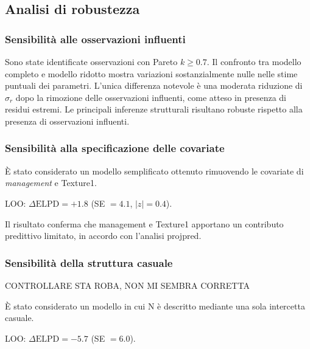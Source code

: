 \documentclass[11pt, a4paper]{article}
\begin{document}
%

\subsection{Analisi di robustezza}
\label{subsec:robustezza}

\subsubsection{Sensibilità alle osservazioni influenti}

Sono state identificate osservazioni con Pareto $k \geq 0.7$.
Il confronto tra modello completo e modello ridotto mostra variazioni sostanzialmente nulle nelle stime puntuali dei parametri. L'unica differenza notevole è una moderata riduzione di $\hat\sigma_r$ dopo la rimozione delle osservazioni influenti, come atteso in presenza di residui estremi. Le principali inferenze strutturali risultano robuste rispetto alla
presenza di osservazioni influenti.

\subsubsection{Sensibilità alla specificazione delle covariate}

È stato considerato un modello semplificato ottenuto rimuovendo le
covariate di \textit{management} e Texture1.

LOO:
$\Delta\text{ELPD}=+1.8$
(SE $=4.1$, $|z|=0.4$).

Il risultato conferma che management e Texture1 apportano un contributo
predittivo limitato, in accordo con l'analisi projpred.

\subsubsection{Sensibilità della struttura casuale}
CONTROLLARE STA ROBA, NON MI SEMBRA CORRETTA

È stato considerato un modello in cui N è descritto mediante una sola
intercetta casuale.

LOO:
$\Delta\text{ELPD}=-5.7$
(SE $=6.0$).
\end{document}
